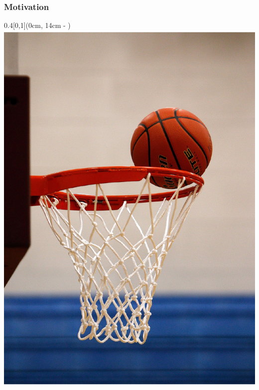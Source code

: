 \begin{frame}
	\frametitle{Motivation}	
	\vspace{1cm}
	
		
		\begin{textblock*}{0.4\paperwidth}[0,1](0cm, 14cm - \PraesentationSeitenrand)%
			\includegraphics[width=0.4\paperwidth]{./Ressourcen/Figures/basketball.pdf}
		\end{textblock*}
		

\end{frame}
